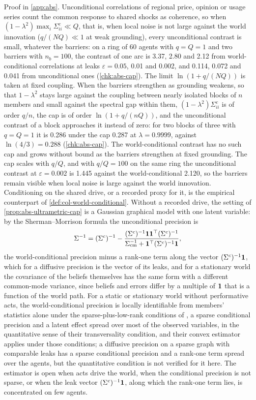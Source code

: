 Proof in \cref{app:abs}. Unconditional correlations of regional price, opinion or usage series count the common response to shared shocks as coherence, so when $(1-\lambda^2)\max_i\Sigma^c_{ii}\ll Q$, that is, when local noise is not large against the world innovation ($q/(NQ)\ll1$ at weak grounding), every unconditional contrast is small, whatever the barriers: on a ring of 60 agents with $q=Q=1$ and two barriers with $n_b=100$, the contrast of one arc is 3.37, 2.80 and 2.12 from world-conditional correlations at leaks $\varepsilon=0.05$, 0.01 and 0.002, and 0.114, 0.072 and 0.041 from unconditional ones (\cref{chk:abs-cap}). The limit $\ln(1+q/(NQ))$ is taken at fixed coupling. When the barriers strengthen as grounding weakens, so that $1-\lambda^2$ stays large against the coupling between nearly isolated blocks of $n$ members and small against the spectral gap within them, $(1-\lambda^2)\Sigma^c_{ii}$ is of order $q/n$, the cap is of order $\ln(1+q/(nQ))$, and the unconditional contrast of a block approaches it instead of zero: for two blocks of three with $q=Q=1$ it is 0.286 under the cap 0.287 at $\lambda=0.9999$, against $\ln(4/3)=0.288$ (\cref{chk:abs-cap}). The world-conditional contrast has no such cap and grows without bound as the barriers strengthen at fixed grounding. The cap scales with $q/Q$, and with $q/Q=100$ on the same ring the unconditional contrast at $\varepsilon=0.002$ is 1.445 against the world-conditional 2.120, so the barriers remain visible when local noise is large against the world innovation. Conditioning on the shared drive, or a recorded proxy for it, is the empirical counterpart of \cref{def:col-world-conditional}. Without a recorded drive, the setting of \cref{prop:abs-ultrametric-cap} is a Gaussian graphical model with one latent variable: by the Sherman--Morrison formula the unconditional precision is
\[
\Sigma^{-1}=(\Sigma^c)^{-1}-\frac{(\Sigma^c)^{-1}\mathbf{1}\mathbf{1}^\top(\Sigma^c)^{-1}}{\Sigma_{\mathrm{cm}}^{-1}+\mathbf{1}^\top(\Sigma^c)^{-1}\mathbf{1}},
\]
the world-conditional precision minus a rank-one term along the vector $(\Sigma^c)^{-1}\mathbf{1}$, which for a diffusive precision is the vector of its leaks, and for a stationary world the covariance of the beliefs themselves has the same form with a different common-mode variance, since beliefs and errors differ by a multiple of $\mathbf{1}$ that is a function of the world path. For a static or stationary world without performative acts, the world-conditional precision is locally identifiable from members' statistics alone under the sparse-plus-low-rank conditions of \citet{chandrasekaran2012latent}, a sparse conditional precision and a latent effect spread over most of the observed variables, in the quantitative sense of their transversality condition, and their convex estimator applies under those conditions; a diffusive precision on a sparse graph with comparable leaks has a sparse conditional precision and a rank-one term spread over the agents, but the quantitative condition is not verified for it here. The estimator is open when acts drive the world, when the conditional precision is not sparse, or when the leak vector $(\Sigma^c)^{-1}\mathbf{1}$, along which the rank-one term lies, is concentrated on few agents.

